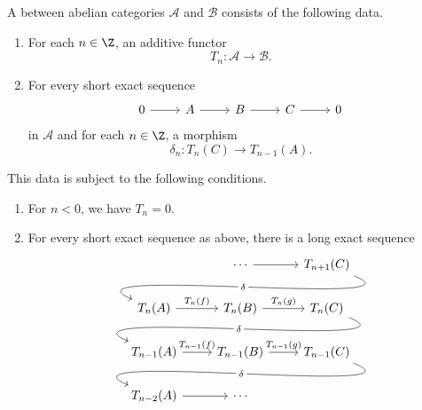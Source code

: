 \documentclass[main.tex]{subfiles}
\begin{document}
\begin{definition}
  \label{def:homological_delta_functor}
  A  between abelian categories $\mathcal{A}$ and $\mathcal{B}$ consists of the following data.
  \begin{enumerate}
    \item For each $n \in \Z$, an additive functor
      \begin{equation*}
        T_{n}\colon \mathcal{A} \to \mathcal{B}.
      \end{equation*}

    \item For every short exact sequence
      \begin{equation*}
        \begin{tikzcd}
          0
          \arrow[r]
          & A
          \arrow[r]
          & B
          \arrow[r]
          & C
          \arrow[r]
          & 0
        \end{tikzcd}
      \end{equation*}
      in $\mathcal{A}$ and for each $n \in \Z$, a morphism
      \begin{equation*}
        \delta_{n}\colon T_{n}(C) \to T_{n-1}(A).
      \end{equation*}
  \end{enumerate}
  This data is subject to the following conditions.
  \begin{enumerate}
    \item For $n < 0$, we have $T_{n} = 0$.

    \item For every short exact sequence as above, there is a long exact sequence
      \begin{equation*}
        \begin{tikzcd}
          & \cdots
          \arrow[r]
          & T_{n+1}(C)
          \\
          T_{n}(A)
          \arrow[from=urr, out=-22, in=157, looseness=1, overlay, "\delta" description]
          \arrow[r, "T_{n}(f)"]
          & T_{n}(B)
          \arrow[r, "T_{n}(g)"]
          & T_{n}(C)
          \\
          T_{n-1}(A)
          \arrow[from=urr, out=-22, in=157, looseness=1, overlay, "\delta" description]
          \arrow[r, "T_{n-1}(f)"]
          & T_{n-1}(B)
          \arrow[r, "T_{n-1}(g)"]
          & T_{n-1}(C)
          \\
          T_{n-2}(A)
          \arrow[from=urr, out=-22, in=157, looseness=1, overlay, "\delta" description]
          \arrow[r]
          & \cdots
        \end{tikzcd}
      \end{equation*}


\end{enumerate}
\end{definition}
\end{document}
